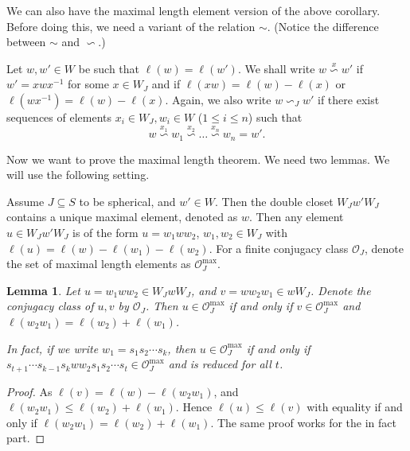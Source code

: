 \documentclass[a4paper, reqno, 14pt]{amsart}
\def\i{{^{-1}}}
\def\subset{\subseteq}
\def\co{\mathcal{O}}
\newtheorem{lem}[thm]{Lemma}
\theoremstyle{definition}
\theoremstyle{remark}
\numberwithin{equation}{section}
\numberwithin{thm}{section}
\begin{document}
    We can also have the maximal length element version of the above corollary. Before doing this, we need a variant of the relation $\sim$. (Notice the difference between $\sim$ and $\backsim$.)
    \label{defmaxequ}
    
    Let \( w, w' \in W \) be such that \( \ell(w) = \ell(w') \). We shall write \( w \overset{x}{\backsim} w' \) if \( w' = xwx\i \) for some \( x \in W_J \) and if \( \ell(xw) = \ell(w) - \ell(x) \) or \( \ell(wx\i) = \ell(w) - \ell(x) \). 
    Again, we also write \( w \backsim_J w' \) if there exist sequences of elements \( x_i\in W_J, w_i \in W \) (\( 1 \leq i \leq n \)) such that \[ w \overset{x_1}{\backsim} w_1 \overset{x_2}{\backsim} \dots \overset{x_n}{\backsim} w_n = w'. \] 


    Now we want to prove the maximal length theorem. We need two lemmas. We will use the following setting.
    
    Assume $J\subset S$ to be spherical, and $w'\in W$. Then the double closet $W_Jw'W_J$ contains a unique maximal element, denoted as $w$. Then any element $u\in W_Jw'W_J$ is of the form $u=w_1ww_2$, $w_1,w_2\in W_J$ with $\ell(u)=\ell(w)-\ell(w_1)-\ell(w_2)$. For a finite conjugacy class $\co_J$, denote the set of maximal length elements as $\co_J^{\max}$.
    \begin{lem}\label{lem:maxdoublecoset}
        Let $u=w_1ww_2\in W_JwW_J$, and $v=ww_2w_1\in wW_J$. Denote the conjugacy class of $u,v$ by $\co_J$. Then $u\in \co_J^{\max}$ if and only if $v\in \co_J^{\max}$ and $\ell(w_2w_1)=\ell(w_2)+\ell(w_1)$.

        In fact, if we write $w_1=s_1s_2\cdots s_k$, then $u\in \co_J^{\max}$ if and only if \\ $s_{t+1}\cdots s_{k-1}s_kww_2s_1s_2\cdots s_t\in \co_J^{\max}$ and is reduced for all $t$.
    \end{lem}
    \begin{proof}
        As $\ell(v)=\ell(w)-\ell(w_2w_1)$, and $\ell(w_2w_1)\leq \ell(w_2)+\ell(w_1)$. Hence $\ell(u)\leq \ell(v)$ with equality if and only if $\ell(w_2w_1)=\ell(w_2)+\ell(w_1)$. The same proof works for the in fact part.
    \end{proof}
\end{document}
